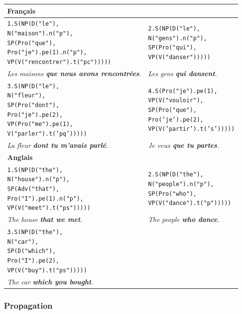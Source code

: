 \documentclass[11pt]{article} %
\newcommand{\real}[1]{\emph{#1}}
\begin{document}
\begin{tabular}{p{8cm} | p{7cm}}
\hline 
\textbf{Français} \\
\hline
\begin{alltt}
1.S(NP(D("le"),
       N("maison").n("p"),
       SP(Pro("que"),
          Pro("je").pe(1).n("p"),
          VP(V("rencontrer").t("pc")))))
\end{alltt} &
\begin{alltt}
2.S(NP(D("le"),
       N("gens").n("p"),
       SP(Pro("qui"),
          VP(V("danser")))))
\end{alltt} \\
\real{Les maisons \textbf{que nous avons rencontrées}.} & \real{Les gens \textbf{qui dansent}.} \\
\hline
\begin{alltt}
3.S(NP(D("le"),
       N("fleur"),
       SP(Pro("dont"),
          Pro("je").pe(2),
          VP(Pro("me").pe(1),
             V("parler").t('pq')))))
\end{alltt} &
\begin{alltt}
4.S(Pro("je").pe(1),
    VP(V("vouloir"),
       SP(Pro("que"),
          Pro('je').pe(2),
          VP(V('partir').t('s')))))
\end{alltt} \\
\real{La fleur \textbf{dont tu m'avais parlé}.} & \real{Je veux \textbf{que tu partes}.} \\
\hline 
\textbf{Anglais} \\
\hline
\begin{alltt}
1.S(NP(D("the"),
       N("house").n("p"),
       SP(Adv("that"),
          Pro("I").pe(1).n("p"),
          VP(V("meet").t("ps")))))
\end{alltt} &
\begin{alltt}
2.S(NP(D("the"),
       N("people").n("p"),
       SP(Pro("who"),
          VP(V("dance").t("p")))))
\end{alltt} \\
\real{The house \textbf{that we met}.} & \real{The people \textbf{who dance}.} \\
\hline
\begin{alltt}
3.S(NP(D("the"),
       N("car"),
       SP(D("which"),
          Pro("I").pe(2),
          VP(V("buy").t("ps")))))
\end{alltt} \\
\real{The car \textbf{which you bought}.}
\end{tabular}

\subsubsection{Propagation}
\end{document}
